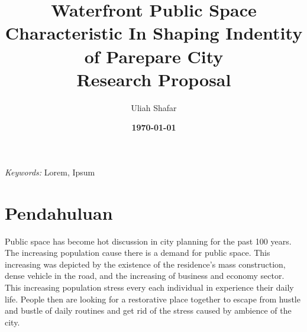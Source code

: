 \documentclass[11pt]{simart} %
\title{
\textbf{Waterfront Public Space Characteristic In Shaping Indentity of Parepare City} \\
\textbf{{Research Proposal \\}}
} %
\date{\textbf{\today}}
\author{Uliah Shafar}
\begin{document}
\maketitle %

\begin{comment}

\begin{abstract}
Lorem ipsum dolor sit amet, consectetur adipiscing elit. Curabitur eget faucibus dolor. In posuere, est nec mollis ultrices, ante arcu tristique odio, et rhoncus tortor enim vitae lectus. Aenean auctor enim tempor risus vulputate finibus. Ut quis molestie ex, ut fringilla mauris. Suspendisse ornare sapien nec neque placerat dignissim. Sed vehicula feugiat dolor et blandit. Maecenas convallis diam a lacus faucibus faucibus. Quisque efficitur velit quis lorem consectetur, ac dictum est egestas.

\end{abstract}

\end{comment}
\hspace*{3.6mm}\textit{Keywords:} Lorem, Ipsum %

\vspace{30pt} %

\section{Pendahuluan}

Public space has become hot discussion in city planning for the past 100 years. The increasing population cause there is a demand for public space. This increasing was depicted by the existence of the  residence's mass construction, dense vehicle in the road, and the increasing of business and economy sector. This increasing population stress every each individual in experience their daily life.
People then are looking for a restorative place together to escape from hustle and bustle of daily routines and get rid of the stress caused by ambience of the city.
\end{document}

